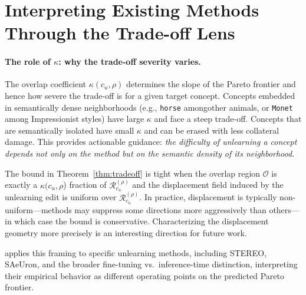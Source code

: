 \section{Interpreting Existing Methods Through the Trade-off Lens}
\label{app:method_analysis}
\paragraph{The role of $\kappa$: why the trade-off severity varies.}
The overlap coefficient $\kappa(c_u,\rho)$ determines the slope of the Pareto frontier and hence how severe the trade-off is for a given target concept. Concepts embedded in semantically dense neighborhoods (e.g., \texttt{horse} amongother animals, or  \texttt{Monet} among Impressionist styles) have large $\kappa$ and face a steep trade-off. Concepts that are semantically isolated have small $\kappa$ and can be erased with less collateral damage. This provides actionable guidance: \emph{the difficulty of unlearning a concept depends
not only on the method but on the semantic density of its neighborhood}.

\begin{remark}
\label{rem:tightness}
The bound in Theorem~\ref{thm:tradeoff} is tight when the overlap region $\mathcal{O}$ is exactly a $\kappa(c_u,\rho$) fraction of $\mathcal{R}_{c_u}^{(\rho)}$ and the displacement field induced by the unlearning edit is uniform over $\mathcal{R}_{c_u}^{(\rho)}$. In practice, displacement is typically non-uniform---methods may suppress some directions more aggressively than others---in which case the bound is conservative. Characterizing the displacement geometry more precisely is an interesting direction for future work.
\end{remark}
 applies this framing to specific unlearning methods, including STEREO, SAeUron, and the broader fine-tuning vs.\ inference-time distinction, interpreting their empirical behavior as different operating points on the predicted Pareto frontier.

